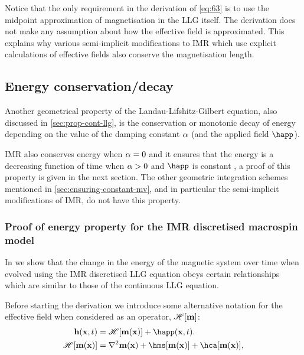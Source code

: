 Notice that the only requirement in the derivation of \cref{eq:63} is to use the midpoint approximation of magnetisation in the LLG itself.
The derivation does not make any assumption about how the effective field is approximated.
This explains why various semi-implicit modifications to IMR which use explicit calculations of effective fields also conserve the magnetisation length.



\subsection{Energy conservation/decay}
\label{sec:energy-cons}

Another geometrical property of the Landau-Lifshitz-Gilbert equation, also discussed in \cref{sec:prop-cont-llg}, is the conservation or monotonic decay of energy depending on the value of the damping constant $\alpha$ (and the applied field $\happ$).

IMR also conserves energy when $\alpha = 0$ and it ensures that the energy is a decreasing function of time when $\alpha > 0$ and $\happ$ is constant \cite{DAquino2005}, a proof of this property is given in the next section.
The other geometric integration schemes mentioned in \cref{sec:ensuring-constant-mv}, and in particular the semi-implicit modifications of IMR, do not have this property.


\subsubsection{Proof of energy property for the IMR discretised macrospin model}
\label{sec:proof-energy-prop}

\newcommand{\happerror}{\mathcal{E}_\text{ap}}

In  we show that the change in the energy of the magnetic system over time when evolved using the IMR discretised LLG equation obeys certain relationships which are similar to those of the continuous LLG equation.

Before starting the derivation we introduce some alternative notation for the effective field when considered as an operator, $\mathscr{H} {\left[ \boldsymbol{\mathrm{m}} \right]}$:
\begin{equation}
  \begin{aligned}
    \label{eq:hop}
    \hv(\xv, t) &= \hopb{\mv(\xv)} + \happ(\xv, t). \\
    \hopb{\mv(\xv)} &= \lap \mv(\xv) + \hms[\mv(\xv)] + \hca[\mv(\xv)], \\
  \end{aligned}
\end{equation}

